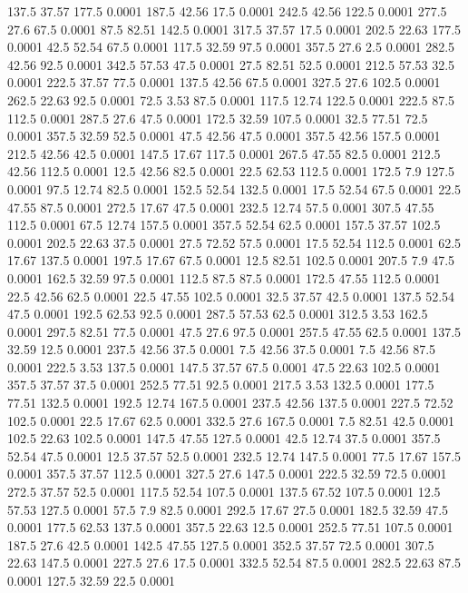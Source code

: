 137.5	37.57	177.5	0.0001
187.5	42.56	17.5	0.0001
242.5	42.56	122.5	0.0001
277.5	27.6	67.5	0.0001
87.5	82.51	142.5	0.0001
317.5	37.57	17.5	0.0001
202.5	22.63	177.5	0.0001
42.5	52.54	67.5	0.0001
117.5	32.59	97.5	0.0001
357.5	27.6	2.5	0.0001
282.5	42.56	92.5	0.0001
342.5	57.53	47.5	0.0001
27.5	82.51	52.5	0.0001
212.5	57.53	32.5	0.0001
222.5	37.57	77.5	0.0001
137.5	42.56	67.5	0.0001
327.5	27.6	102.5	0.0001
262.5	22.63	92.5	0.0001
72.5	3.53	87.5	0.0001
117.5	12.74	122.5	0.0001
222.5	87.5	112.5	0.0001
287.5	27.6	47.5	0.0001
172.5	32.59	107.5	0.0001
32.5	77.51	72.5	0.0001
357.5	32.59	52.5	0.0001
47.5	42.56	47.5	0.0001
357.5	42.56	157.5	0.0001
212.5	42.56	42.5	0.0001
147.5	17.67	117.5	0.0001
267.5	47.55	82.5	0.0001
212.5	42.56	112.5	0.0001
12.5	42.56	82.5	0.0001
22.5	62.53	112.5	0.0001
172.5	7.9	127.5	0.0001
97.5	12.74	82.5	0.0001
152.5	52.54	132.5	0.0001
17.5	52.54	67.5	0.0001
22.5	47.55	87.5	0.0001
272.5	17.67	47.5	0.0001
232.5	12.74	57.5	0.0001
307.5	47.55	112.5	0.0001
67.5	12.74	157.5	0.0001
357.5	52.54	62.5	0.0001
157.5	37.57	102.5	0.0001
202.5	22.63	37.5	0.0001
27.5	72.52	57.5	0.0001
17.5	52.54	112.5	0.0001
62.5	17.67	137.5	0.0001
197.5	17.67	67.5	0.0001
12.5	82.51	102.5	0.0001
207.5	7.9	47.5	0.0001
162.5	32.59	97.5	0.0001
112.5	87.5	87.5	0.0001
172.5	47.55	112.5	0.0001
22.5	42.56	62.5	0.0001
22.5	47.55	102.5	0.0001
32.5	37.57	42.5	0.0001
137.5	52.54	47.5	0.0001
192.5	62.53	92.5	0.0001
287.5	57.53	62.5	0.0001
312.5	3.53	162.5	0.0001
297.5	82.51	77.5	0.0001
47.5	27.6	97.5	0.0001
257.5	47.55	62.5	0.0001
137.5	32.59	12.5	0.0001
237.5	42.56	37.5	0.0001
7.5	42.56	37.5	0.0001
7.5	42.56	87.5	0.0001
222.5	3.53	137.5	0.0001
147.5	37.57	67.5	0.0001
47.5	22.63	102.5	0.0001
357.5	37.57	37.5	0.0001
252.5	77.51	92.5	0.0001
217.5	3.53	132.5	0.0001
177.5	77.51	132.5	0.0001
192.5	12.74	167.5	0.0001
237.5	42.56	137.5	0.0001
227.5	72.52	102.5	0.0001
22.5	17.67	62.5	0.0001
332.5	27.6	167.5	0.0001
7.5	82.51	42.5	0.0001
102.5	22.63	102.5	0.0001
147.5	47.55	127.5	0.0001
42.5	12.74	37.5	0.0001
357.5	52.54	47.5	0.0001
12.5	37.57	52.5	0.0001
232.5	12.74	147.5	0.0001
77.5	17.67	157.5	0.0001
357.5	37.57	112.5	0.0001
327.5	27.6	147.5	0.0001
222.5	32.59	72.5	0.0001
272.5	37.57	52.5	0.0001
117.5	52.54	107.5	0.0001
137.5	67.52	107.5	0.0001
12.5	57.53	127.5	0.0001
57.5	7.9	82.5	0.0001
292.5	17.67	27.5	0.0001
182.5	32.59	47.5	0.0001
177.5	62.53	137.5	0.0001
357.5	22.63	12.5	0.0001
252.5	77.51	107.5	0.0001
187.5	27.6	42.5	0.0001
142.5	47.55	127.5	0.0001
352.5	37.57	72.5	0.0001
307.5	22.63	147.5	0.0001
227.5	27.6	17.5	0.0001
332.5	52.54	87.5	0.0001
282.5	22.63	87.5	0.0001
127.5	32.59	22.5	0.0001
